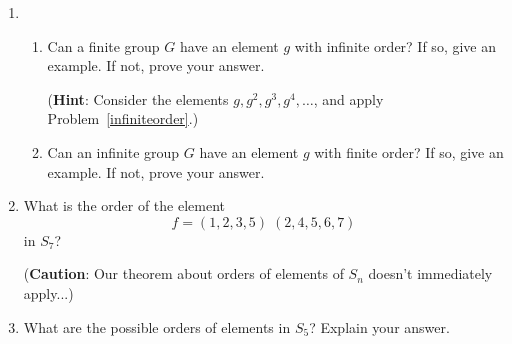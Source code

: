 \documentclass[11pt,twoside]{article}
\begin{document}
\begin{enumerate}
\item \begin{enumerate}[label=(\alph*)]

\item Can a finite group $G$ have an element $g$ with infinite order?  If so, give an example.  If not, prove your answer.

\vspace{0.1cm}

\noindent ({\bf Hint}: Consider the elements $g,g^2,g^3,g^4,\ldots$, and apply Problem~\ref{infiniteorder}.)

\vspace{0.25cm}

\item Can an infinite group $G$ have an element $g$ with finite order?  If so, give an example.  If not, prove your answer.

\vspace{0.5cm}

\end{enumerate}

\item What is the order of the element
\[f = (1,2,3,5)\;(2,4,5,6,7)\]
in $S_7$?

\vspace{0.1cm}
\noindent ({\bf Caution}: Our theorem about orders of elements of $S_n$ doesn't immediately apply...)

\vspace{0.5cm}

\item What are the possible orders of elements in $S_5$?  Explain your answer.

\vspace{0.5cm} 

\end{enumerate}
\end{document}
